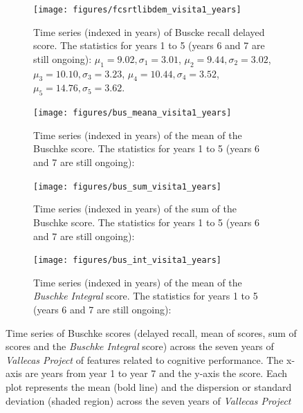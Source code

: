 \documentclass[11pt]{article}
\theoremstyle{definition}
\theoremstyle{remark}
\begin{document}
\begin{figure}[H]
    \centering
    \begin{subfigure}[t]{0.45\textwidth}
        \centering
        \texttt{[image: figures/fcsrtlibdem\_visita1\_years]}
        \caption{Time series (indexed in years) of Buscke recall delayed score. The statistics for years 1 to 5 (years 6 and 7 are still ongoing): $\mu_{1}=9.02, \sigma_{1}=3.01$, $\mu_{2}=9.44, \sigma_{2}=3.02$, $\mu_{3}=10.10, \sigma_{3}=3.23$, $\mu_{4}=10.44, \sigma_{4}=3.52$,$\mu_{5}=14.76,\sigma_{5}=3.62$.}
    \end{subfigure}
    \hfill
    \begin{subfigure}[t]{0.45\textwidth}
        \centering
        \texttt{[image: figures/bus\_meana\_visita1\_years]}
        \caption{Time series (indexed in years) of the mean of the Buschke score. The statistics for years 1 to 5 (years 6 and 7 are still ongoing): }
    \end{subfigure}%
    
     \begin{subfigure}[t]{0.45\textwidth}
        \centering
        \texttt{[image: figures/bus\_sum\_visita1\_years]}
        \caption{Time series (indexed in years) of the sum of the Buschke score. The statistics for years 1 to 5 (years 6 and 7 are still ongoing):}
    \end{subfigure}
    \hfill 
    \begin{subfigure}[t]{0.45\textwidth}
        \centering
        \texttt{[image: figures/bus\_int\_visita1\_years]}
        \caption{Time series (indexed in years) of the mean of the \emph{Buschke Integral} score. The statistics for years 1 to 5 (years 6 and 7 are still ongoing):}
    \end{subfigure}%
   
    \caption{Time series of Buschke scores (delayed recall, mean of scores, sum of scores and the \emph{Buschke Integral} score) across the seven years of \emph{Vallecas Project} of features related to cognitive performance. The x-axis are years from year 1 to year 7 and the y-axis the score. Each plot represents the mean (bold line) and the dispersion or standard deviation (shaded region) across the seven years of \emph{Vallecas Project}} 
    \label{fig:busper4}
\end{figure}


\end{document}
